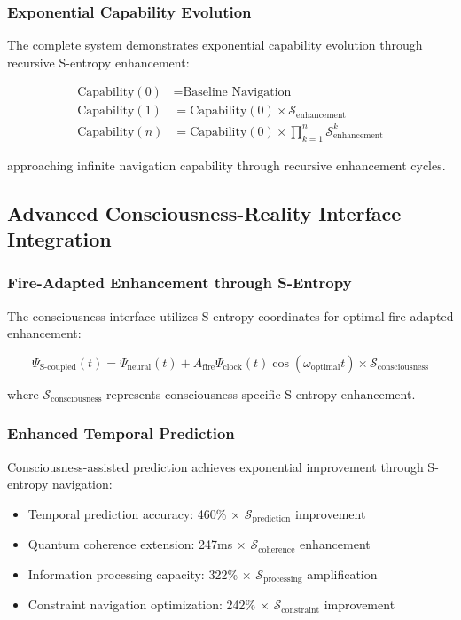 \documentclass[12pt,a4paper]{article}
\begin{document}
{\subsubsection{Exponential Capability Evolution}

The complete system demonstrates exponential capability evolution through recursive S-entropy enhancement:

\begin{align}
\text{Capability}(0) &= \text{Baseline Navigation} \\
\text{Capability}(1) &= \text{Capability}(0) \times \mathcal{S}_{\text{enhancement}} \\
\text{Capability}(n) &= \text{Capability}(0) \times \prod_{k=1}^{n} \mathcal{S}_{\text{enhancement}}^k
\end{align}

approaching infinite navigation capability through recursive enhancement cycles.

\subsection{Advanced Consciousness-Reality Interface Integration}

\subsubsection{Fire-Adapted Enhancement through S-Entropy}

The consciousness interface utilizes S-entropy coordinates for optimal fire-adapted enhancement:

\begin{equation}
\Psi_{\text{S-coupled}}(t) = \Psi_{\text{neural}}(t) + A_{\text{fire}} \Psi_{\text{clock}}(t) \cos(\omega_{\text{optimal}} t) \times \mathcal{S}_{\text{consciousness}}
\end{equation}

where $\mathcal{S}_{\text{consciousness}}$ represents consciousness-specific S-entropy enhancement.

\subsubsection{Enhanced Temporal Prediction}

Consciousness-assisted prediction achieves exponential improvement through S-entropy navigation:

\begin{itemize}
\item Temporal prediction accuracy: 460\% × $\mathcal{S}_{\text{prediction}}$ improvement
\item Quantum coherence extension: 247ms × $\mathcal{S}_{\text{coherence}}$ enhancement
\item Information processing capacity: 322\% × $\mathcal{S}_{\text{processing}}$ amplification
\item Constraint navigation optimization: 242\% × $\mathcal{S}_{\text{constraint}}$ improvement
\end{itemize}

}
\end{document}
